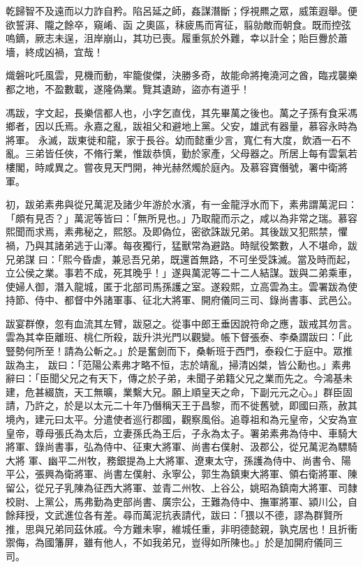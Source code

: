 \begin{pinyinscope}
 乾歸智不及遠而以力詐自矜。陷呂延之師，姦謀潛斷；俘視羆之眾，威策遐舉。便欲誓湃、隴之餘卒，窺崤、函
 之奧區，秣疲馬而宵征，翦勍敵而朝食。既而控弦嗚鏑，厥志未逞，沮岸崩山，其功已喪。履重氛於外難，幸以計全；貽巨釁於蕭墻，終成凶禍，宜哉！



 熾磐叱吒風雲，見機而動，牢籠俊傑，決勝多奇，故能命將掩澆河之酋，臨戎襲樂都之地，不盈數載，遂隆偽業。覽其遺跡，盜亦有道乎！



 馮跋，字文起，長樂信都人也，小字乞直伐，其先畢萬之後也。萬之子孫有食采馮鄉者，因以氏焉。永嘉之亂，跋祖父和避地上黨。父安，雄武有器量，慕容永時為將軍。
 永滅，跋東徙和龍，家于長谷。幼而懿重少言，寬仁有大度，飲酒一石不亂。三弟皆任俠，不脩行業，惟跋恭慎，勤於家產，父母器之。所居上每有雲氣若樓閣，時咸異之。嘗夜見天門開，神光赫然燭於庭內。及慕容寶僭號，署中衛將軍。



 初，跋弟素弗與從兄萬泥及諸少年游於水濱，有一金龍浮水而下，素弗謂萬泥曰：「頗有見否？」萬泥等皆曰：「無所見也。」乃取龍而示之，咸以為非常之瑞。慕容熙聞而求焉，素弗秘之，熙怒。及即偽位，密欲誅跋兄弟。其後跋又犯熙禁，懼禍，乃與其諸弟逃于山澤。每夜獨行，猛獸常為避路。時賦役繁數，人不堪命，跋兄弟謀
 曰：「熙今昏虐，兼忌吾兄弟，既還首無路，不可坐受誅滅。當及時而起，立公侯之業。事若不成，死其晚乎！」遂與萬泥等二十二人結謀。跋與二弟乘車，使婦人御，潛入龍城，匿于北部司馬孫護之室。遂殺熙，立高雲為主。雲署跋為使持節、侍中、都督中外諸軍事、征北大將軍、開府儀同三司、錄尚書事、武邑公。



 跋宴群僚，忽有血流其左臂，跋惡之。從事中郎王垂因說符命之應，跋戒其勿言。雲為其幸臣離班、桃仁所殺，跋升洪光門以觀變。帳下督張泰、李桑謂跋曰：「此豎勢何所至！請為公斬之。」於是奮劍而下，桑斬班于西門，泰殺仁于庭中。眾推跋為主，
 跋曰：「范陽公素弗才略不恒，志於靖亂，掃清凶桀，皆公勳也。」素弗辭曰：「臣聞父兄之有天下，傳之於子弟，未聞子弟籍父兄之業而先之。今鴻基未建，危甚綴旒，天工無曠，業繫大兄。願上順皇天之命，下副元元之心。」群臣固請，乃許之，於是以太元二十年乃僭稱天王于昌黎，而不徙舊號，即國曰燕，赦其境內，建元曰太平。分遣使者巡行郡國，觀察風俗。追尊祖和為元皇帝，父安為宣皇帝，尊母張氏為太后，立妻孫氏為王后，子永為太子。署弟素弗為侍中、車騎大將軍、錄尚書事，弘為侍中、征東大將軍、尚書右僕射、汲郡公，從兄萬泥為驃騎大將
 軍、幽平二州牧，務銀提為上大將軍、遼東太守，孫護為侍中、尚書令、陽平公，張興為衛將軍、尚書左僕射、永寧公，郭生為鎮東大將軍、領右衛將軍、陳留公，從兄子乳陳為征西大將軍、並青二州牧、上谷公，姚昭為鎮南大將軍、司隸校尉、上黨公，馬弗勤為吏部尚書、廣宗公，王難為侍中、撫軍將軍、潁川公，自餘拜授，文武進位各有差。尋而萬泥抗表請代，跋曰：「猥以不德，謬為群賢所推，思與兄弟同茲休戚。今方難未寧，維城任重，非明德懿親，孰克居也！且折衝禦侮，為國籓屏，雖有他人，不如我弟兄，豈得如所陳也。」於是加開府儀同三司。




\end{pinyinscope}
